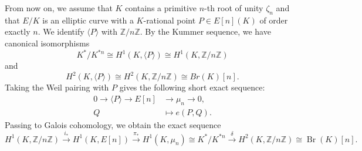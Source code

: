 \documentclass[11pt,a4paper]{amsart}
\theoremstyle{definition}
\newcommand{\Br}{\operatorname{Br}}
\numberwithin{equation}{section}
\begin{document}
From now on, we assume that $K$ contains a primitive
$n$-th root of unity $\zeta_n$ and that $E/K$ is an elliptic curve with a
$K$-rational point $P\in E[n](K)$ of order exactly $n$. We identify
$\langle P\rangle$ with $\mathbb{Z}/n\mathbb{Z}$. By the Kummer
sequence, we have canonical isomorphisms
\[
K^*/K^{*n}\cong H^1(K,\langle P\rangle)\cong H^1(K,\mathbb{Z}/n\mathbb{Z})
\]
and
\[
H^2(K,\langle P\rangle)\cong H^2(K,\mathbb{Z}/n\mathbb{Z})\cong Br(K)[n].
\]
Taking the Weil pairing with $P$ gives the following short exact
sequence:
\begin{align}\label{aa}
	0\longrightarrow \langle P\rangle \longrightarrow E[n]
	&\longrightarrow \mu_n\longrightarrow 0,\\
	Q&\longmapsto e(P,Q).
\end{align}
Passing to Galois cohomology, we obtain the exact sequence 
\begin{equation}\label{bb}
 H^1(K,\mathbb{Z}/n\mathbb{Z})\xrightarrow{i_*} H^1(K,E[n])\xrightarrow{\pi_*} H^1(K,\mu_n)\cong K^*/K^{*n}\xrightarrow{\delta} H^2(K,\mathbb{Z}/n\mathbb{Z})\cong \Br(K)[n].
	\end{equation}	
\end{document}
